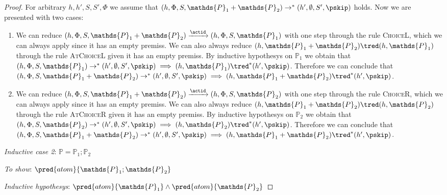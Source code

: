 {\begin{proof}
For arbitrary $h, h', S, S', \Phi$ we assume that $(h, \Phi, S, \mathds{P}_1 + \mathds{P}_2) \rightarrow^* (h', \emptyset, S', \pskip)$ holds. Now we are presented with two cases:
\begin{enumerate}
\item We can reduce $(h, \Phi, S, \mathds{P}_1 + \mathds{P}_2) \xrightarrow{\actid} (h, \Phi, S, \mathds{P}_1)$ with one step through the rule \textsc{ChoiceL}, which we can always apply since it has an empty premiss. We can also always reduce $(h, \mathds{P}_1 + \mathds{P}_2) \tred (h, \mathds{P}_1)$ through the rule \textsc{AtChoiceL} given it has an empty premiss. By inductive hypothesys on $\mathds{P}_1$ we obtain that $(h, \Phi, S, \mathds{P}_1) \rightarrow^* (h', \emptyset, S', \pskip) \implies (h, \mathds{P}_1) \tred^* (h', \pskip)$. Therefore we can conclude that $(h, \Phi, S, \mathds{P}_1 + \mathds{P}_2) \rightarrow^* (h', \emptyset, S', \pskip) \implies  (h, \mathds{P}_1 + \mathds{P}_2) \tred^* (h', \pskip)$.
\item We can reduce $(h, \Phi, S, \mathds{P}_1 + \mathds{P}_2) \xrightarrow{\actid} (h, \Phi, S, \mathds{P}_2)$ with one step through the rule \textsc{ChoiceR}, which we can always apply since it has an empty premiss. We can also always reduce $(h, \mathds{P}_1 + \mathds{P}_2) \tred (h, \mathds{P}_2)$ through the rule \textsc{AtChoiceR} given it has an empty premiss. By inductive hypothesys on $\mathds{P}_2$ we obtain that $(h, \Phi, S, \mathds{P}_2) \rightarrow^* (h', \emptyset, S', \pskip) \implies (h, \mathds{P}_2) \tred^* (h', \pskip)$. Therefore we can conclude that $(h, \Phi, S, \mathds{P}_1 + \mathds{P}_2) \rightarrow^* (h', \emptyset, S', \pskip) \implies  (h, \mathds{P}_1 + \mathds{P}_2) \tred^* (h', \pskip)$. \\
\end{enumerate}

\textit{Inductive case 2}: $\mathds{P} = \mathds{P}_1 ; \mathds{P}_2$

\textit{To show}: $\pred{atom}{\mathds{P}_1 ; \mathds{P}_2}$

\textit{Inductive hypothesys}: $\pred{atom}{\mathds{P}_1} \land \pred{atom}{\mathds{P}_2}$


\end{proof}}

